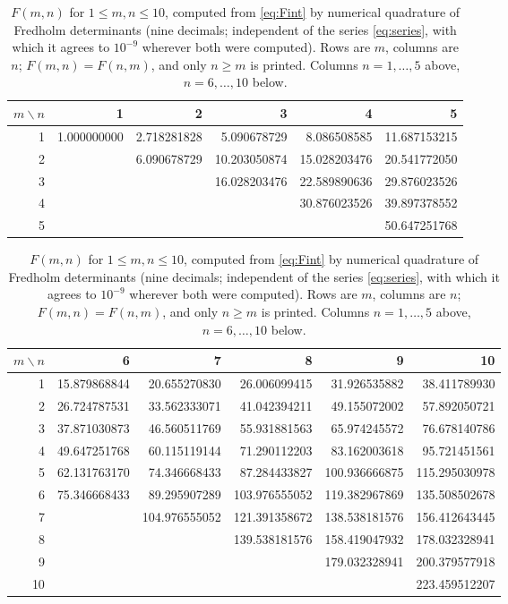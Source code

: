 \documentclass[11pt]{article}
\theoremstyle{definition}
\theoremstyle{remark}
\begin{document}
\begin{table}[tbp]
\centering\footnotesize
\caption{$F(m,n)$ for $1\le m,n\le 10$, computed from \eqref{eq:Fint} by numerical quadrature of Fredholm determinants (nine decimals; independent of the series \eqref{eq:series}, with which it agrees to $10^{-9}$ wherever both were computed). Rows are $m$, columns are $n$; $F(m,n)=F(n,m)$, and only $n\ge m$ is printed. Columns $n=1,\dots,5$ above, $n=6,\dots,10$ below.}
\label{tab:F}
\setlength{\tabcolsep}{4pt}
\begin{tabular}{r|rrrrr}
\toprule
$m\backslash n$ & 1 & 2 & 3 & 4 & 5\\
\midrule
1 & 1.000000000 & 2.718281828 & 5.090678729 & 8.086508585 & 11.687153215\\
2 &  & 6.090678729 & 10.203050874 & 15.028203476 & 20.541772050\\
3 &  &  & 16.028203476 & 22.589890636 & 29.876023526\\
4 &  &  &  & 30.876023526 & 39.897378552\\
5 &  &  &  &  & 50.647251768\\
\bottomrule
\end{tabular}
\medskip

\begin{tabular}{r|rrrrr}
\toprule
$m\backslash n$ & 6 & 7 & 8 & 9 & 10\\
\midrule
1 & 15.879868844 & 20.655270830 & 26.006099415 & 31.926535882 & 38.411789930\\
2 & 26.724787531 & 33.562333071 & 41.042394211 & 49.155072002 & 57.892050721\\
3 & 37.871030873 & 46.560511769 & 55.931881563 & 65.974245572 & 76.678140786\\
4 & 49.647251768 & 60.115119144 & 71.290112203 & 83.162003618 & 95.721451561\\
5 & 62.131763170 & 74.346668433 & 87.284433827 & 100.936666875 & 115.295030978\\
6 & 75.346668433 & 89.295907289 & 103.976555052 & 119.382967869 & 135.508502678\\
7 &  & 104.976555052 & 121.391358672 & 138.538181576 & 156.412643445\\
8 &  &  & 139.538181576 & 158.419047932 & 178.032328941\\
9 &  &  &  & 179.032328941 & 200.379577918\\
10 &  &  &  &  & 223.459512207\\
\bottomrule
\end{tabular}
\end{table}
\end{document}
